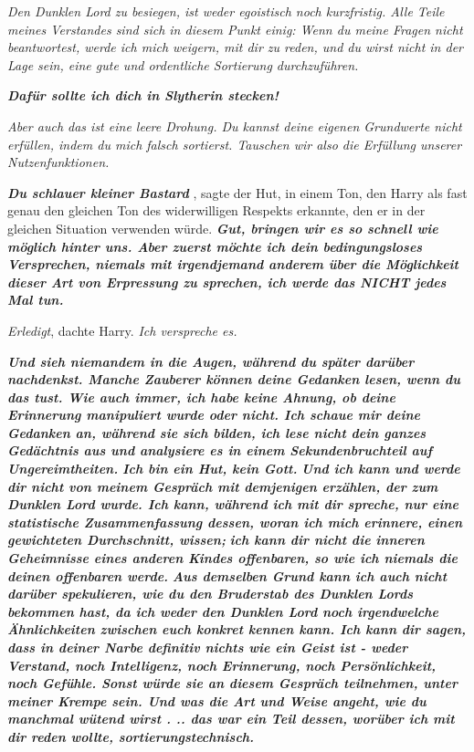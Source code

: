 \emph{ Den Dunklen Lord zu besiegen, ist weder egoistisch noch kurzfristig. Alle
Teile meines Verstandes sind sich in diesem Punkt einig: Wenn du meine Fragen
nicht beantwortest, werde ich mich weigern, mit dir zu reden, und du wirst nicht
in der Lage sein, eine gute und ordentliche Sortierung durchzuführen.}

\textbf{\emph{ \glqq Dafür sollte ich dich in Slytherin stecken!\grqq{} }}

\emph{ Aber auch das ist eine leere Drohung. Du kannst deine eigenen Grundwerte
nicht erfüllen, indem du mich falsch sortierst. Tauschen wir also die Erfüllung
unserer Nutzenfunktionen.}

\textbf{\emph{ \glqq Du schlauer kleiner Bastard\grqq{} }}, sagte der Hut, in
einem Ton, den Harry als fast genau den gleichen Ton des widerwilligen Respekts
erkannte, den er in der gleichen Situation verwenden würde. \textbf{\emph{ \glqq
Gut, bringen wir es so schnell wie möglich hinter uns. Aber zuerst möchte ich
dein bedingungsloses Versprechen, niemals mit irgendjemand anderem über die
Möglichkeit dieser Art von Erpressung zu sprechen, ich werde das NICHT jedes Mal
tun.\grqq{} }}

\emph{Erledigt}, dachte Harry.\emph{ Ich verspreche es.}

\textbf{\emph{ \glqq Und sieh niemandem in die Augen, während du später darüber
nachdenkst. Manche Zauberer können deine Gedanken lesen, wenn du das tust. Wie
auch immer, ich habe keine Ahnung, ob deine Erinnerung manipuliert wurde oder
nicht. Ich schaue mir deine Gedanken an, während sie sich bilden, ich lese nicht
dein ganzes Gedächtnis aus und analysiere es in einem Sekundenbruchteil auf
Ungereimtheiten.}} \textbf{\emph{ Ich bin ein Hut, kein Gott. }} \textbf{}
\textbf{\emph{Und ich kann und werde dir nicht von meinem Gespräch mit
demjenigen erzählen, der zum Dunklen Lord wurde. Ich kann, während ich mit dir
spreche, nur eine statistische Zusammenfassung dessen, woran ich mich erinnere,
einen gewichteten Durchschnitt, wissen; }} \textbf{} \textbf{\emph{ich kann dir
nicht die inneren Geheimnisse eines anderen Kindes offenbaren, so wie ich
niemals die deinen offenbaren werde.}} \textbf{\emph{ Aus demselben Grund kann
ich auch nicht darüber spekulieren, wie du den Bruderstab des Dunklen Lords
bekommen hast, da ich weder den Dunklen Lord noch irgendwelche Ähnlichkeiten
zwischen euch konkret kennen kann. Ich kann dir sagen, dass in deiner Narbe
definitiv nichts wie ein Geist ist - weder Verstand, noch Intelligenz, noch
Erinnerung, noch Persönlichkeit, noch Gefühle. Sonst würde sie an diesem
Gespräch teilnehmen, unter meiner Krempe sein. Und was die Art und Weise angeht,
wie du manchmal wütend wirst . .. das war ein Teil dessen, worüber ich mit dir
reden wollte, sortierungstechnisch.\grqq{} }}

